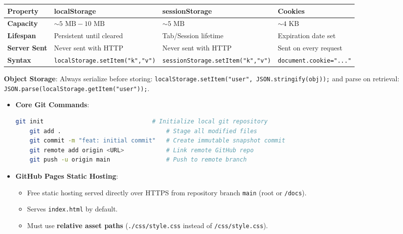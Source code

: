 \documentclass[a4paper,11pt]{article}
\begin{document}
\begin{handwbox}
\begin{center}
\begin{tabularx}{\textwidth}{l X X X}
\toprule
\textbf{Property} & \textbf{localStorage} & \textbf{sessionStorage} & \textbf{Cookies} \\
\midrule
\textbf{Capacity} & $\sim 5\text{ MB} - 10\text{ MB}$ & $\sim 5\text{ MB}$ & $\sim 4\text{ KB}$ \\
\textbf{Lifespan} & Persistent until cleared & Tab/Session lifetime & Expiration date set \\
\textbf{Server Sent} & Never sent with HTTP & Never sent with HTTP & Sent on every request \\
\textbf{Syntax} & \texttt{localStorage.setItem("k","v")} & \texttt{sessionStorage.setItem("k","v")} & \texttt{document.cookie="..."} \\
\bottomrule
\end{tabularx}
\end{center}
\textbf{Object Storage}: Always serialize before storing: \texttt{localStorage.setItem("user", JSON.stringify(obj));} and parse on retrieval: \texttt{JSON.parse(localStorage.getItem("user"));}.
\end{handwbox}

\begin{conceptbox}
\begin{itemize}[leftmargin=*]
    \item \textbf{Core Git Commands}:
    \begin{lstlisting}[language=bash]
    git init                               # Initialize local git repository
    git add .                              # Stage all modified files
    git commit -m "feat: initial commit"   # Create immutable snapshot commit
    git remote add origin <URL>            # Link remote GitHub repo
    git push -u origin main                # Push to remote branch
    \end{lstlisting}
    \item \textbf{GitHub Pages Static Hosting}:
    \begin{itemize}
        \item Free static hosting served directly over HTTPS from repository branch \texttt{main} (root or \texttt{/docs}).
        \item Serves \texttt{index.html} by default.
        \item Must use \textbf{relative asset paths} (\texttt{./css/style.css} instead of \texttt{/css/style.css}).
    \end{itemize}
\end{itemize}
\end{conceptbox}
\end{document}

